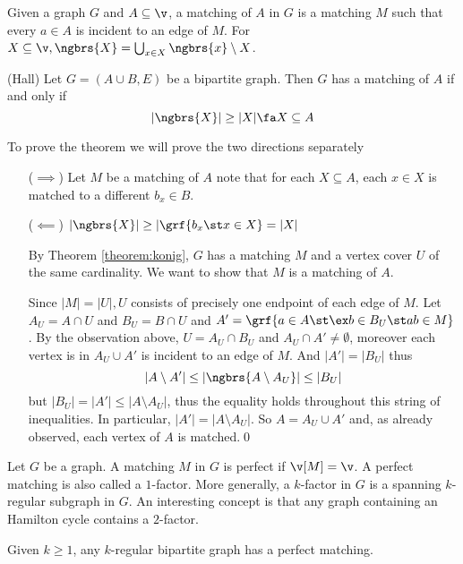 Given a graph $G$ and $A \subseteq \v$, a matching of $A$ in $G$ is a matching $M$ such that every $a \in A$ is incident to an edge of $M$. For $X \subseteq \v, \ngbrs{X} = \bigcup_{x \in X} \ngbrs{x} \setminus X$.
\begin{customtheorem}{(Hall)}
\label{theorem:hall}
    Let $G = (A \cup B, E)$ be a bipartite graph. Then $G$ has a matching of $A$ if and only if
    \begin{equation*}
        |\ngbrs{X}| \geq |X| \fa X \subseteq A
    \end{equation*}
\end{customtheorem}
\begin{prf}
    To prove the theorem we will prove the two directions separately
    \begin{itemize}
        \item [($\implies$)] Let $M$ be a matching of $A$ note that for each $X \subseteq A$, each $x \in X$ is matched to a different $b_x \in B$.
        \item [($\impliedby$)] $|\ngbrs{X}| \geq |\grf{b_x \st x \in X} = |X|$
        
        By Theorem \ref{theorem:konig}, $G$ has a matching $M$ and a vertex cover $U$ of the same cardinality. We want to show that $M$ is a matching of $A$.

        Since $|M| = |U|, U$ consists of precisely one endpoint of each edge of $M$. Let $A_U = A \cap U$ and $B_U = B \cap U$ and $A' = \grf{a \in A \st \ex b \in B_U \st ab \in M}$. By the observation above, $U = A_U \cap B_U$ and $A_U \cap A' \neq \emptyset$, moreover each vertex is in $A_U \cup A'$ is incident to an edge of $M$. And $|A'| = |B_U|$ thus
        \begin{equation*}
            |A \setminus A'| \leq |\ngbrs{A \setminus A_U}| \leq |B_U|
        \end{equation*}
        but $|B_U| = |A'| \leq |A \setminus A_U|$, thus the equality holds throughout this string of inequalities. In particular, $|A'| = |A \setminus A_U|$. So $A = A_U \cup A'$ and, as already observed, each vertex of $A$ is matched.\qed
    \end{itemize}
\end{prf}
Let $G$ be a graph. A matching $M$ in $G$ is perfect if $\v[M] = \v$. A perfect matching is also called a $1$-factor. More generally, a $k$-factor in $G$ is a spanning $k$-regular subgraph in $G$. An interesting concept is that any graph containing an Hamilton cycle contains a $2$-factor.
\begin{customcorollary}{2.4}
\label{corollary:2.4}
    Given $k \geq 1$, any $k$-regular bipartite graph has a perfect matching.
\end{customcorollary}
